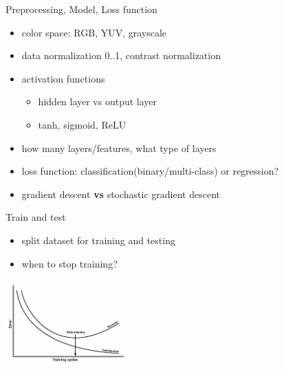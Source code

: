 \documentclass{beamer}
\begin{document}
\begin{frame}{Preprocessing, Model, Loss function}
	\begin{itemize}
		\item color space: RGB, YUV, grayscale
		\item data normalization 0..1, contrast normalization
		\item activation functions
		\begin{itemize}
			\item hidden layer vs output layer
			\item tanh, sigmoid, ReLU
		\end{itemize}
		\item how many layers/features, what type of layers
		\item loss function: classification(binary/multi-class) or regression?
		\item gradient descent \textbf{vs} stochastic gradient descent
	\end{itemize}
\end{frame}

\begin{frame}{Train and test}
	\begin{itemize}
		\item split dataset for training and testing
		\item when to stop training?
	\end{itemize}
	 \includegraphics[width=180px,height=123px]{img/traintest.jpg}
	 \begin{flushleft}
	 
			 \\
			\vspace*{-0.2cm}			
	\end{flushleft}
\end{frame}
\end{document}
